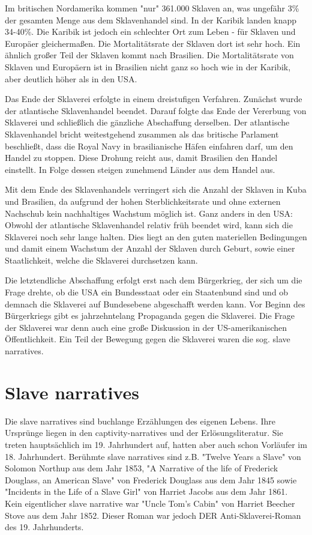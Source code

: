 \documentclass[10pt,a4paper,oneside,ngerman,numbers=noenddot]{scrartcl}
\begin{document}
Im britischen Nordamerika kommen "nur" 361.000 Sklaven an, was ungefähr 3\% der
gesamten Menge aus dem Sklavenhandel sind. In der Karibik landen knapp 34-40\%.
Die Karibik ist jedoch ein schlechter Ort zum Leben - für Sklaven und Europäer
gleichermaßen. Die Mortalitätsrate der Sklaven dort ist sehr hoch. Ein ähnlich
großer Teil der Sklaven kommt nach Brasilien. Die Mortalitätsrate von Sklaven
und Europäern ist in Brasilien nicht ganz so hoch wie in der Karibik, aber
deutlich höher als in den USA.

Das Ende der Sklaverei erfolgte in einem dreistufigen Verfahren. Zunächst wurde
der atlantische Sklavenhandel beendet. Darauf folgte das Ende der Vererbung von
Sklaverei und schließlich die gänzliche Abschaffung derselben. Der atlantische
Sklavenhandel bricht weitestgehend zusammen als das britische Parlament beschließt,
dass die Royal Navy in brasilianische Häfen einfahren darf, um den Handel zu
stoppen. Diese Drohung reicht aus, damit Brasilien den Handel einstellt. In Folge
dessen steigen zunehmend Länder aus dem Handel aus.

Mit dem Ende des Sklavenhandels verringert sich die Anzahl der Sklaven in Kuba
und Brasilien, da aufgrund der hohen Sterblichkeitsrate und ohne externen Nachschub
kein nachhaltiges Wachstum möglich ist. Ganz anders in den USA: Obwohl der
atlantische Sklavenhandel relativ früh beendet wird, kann sich die Sklaverei
noch sehr lange halten. Dies liegt an den guten materiellen Bedingungen und damit
einem Wachstum der Anzahl der Sklaven durch Geburt, sowie einer Staatlichkeit,
welche die Sklaverei durchsetzen kann.

Die letztendliche Abschaffung erfolgt erst nach dem Bürgerkrieg, der sich um
die Frage drehte, ob die USA ein Bundesstaat oder ein Staatenbund sind und ob
demnach die Sklaverei auf Bundesebene abgeschafft werden kann. Vor Beginn des
Bürgerkriegs gibt es jahrzehntelang Propaganda gegen die Sklaverei. Die Frage
der Sklaverei war denn auch eine große Diskussion in der US-amerikanischen
Öffentlichkeit. Ein Teil der Bewegung gegen die Sklaverei waren die sog.
slave narratives.

\section*{Slave narratives}

Die slave narratives sind buchlange Erzählungen des eigenen Lebens. Ihre Ursprünge
liegen in den captivity-narratives und der Erlösungsliteratur. Sie treten
hauptsächlich im 19. Jahrhundert auf, hatten aber auch schon Vorläufer im 18.
Jahrhundert. Berühmte slave narratives sind z.B. "Twelve Years a Slave" von
Solomon Northup aus dem Jahr 1853, "A Narrative of the life of Frederick Douglass,
an American Slave" von Frederick Douglass aus dem Jahr 1845 sowie "Incidents in
the Life of a Slave Girl" von Harriet Jacobs aus dem Jahr 1861. Kein eigentlicher
slave narrative war "Uncle Tom's Cabin" von Harriet Beecher Stove aus dem Jahr
1852. Dieser Roman war jedoch DER Anti-Sklaverei-Roman des 19. Jahrhunderts.
\end{document}
